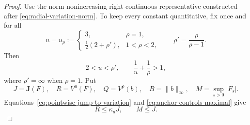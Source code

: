 \documentclass[11pt]{article}
\numberwithin{equation}{section}
\theoremstyle{remark}
\theoremstyle{definition}
\begin{document}
\begin{proof}
Use the norm-nonincreasing right-continuous representative constructed
after \eqref{eq:radial-variation-norm}.  To keep every constant quantitative,
fix once and for all
\[
 u=u_\rho:=
 \begin{cases}
  3,&\rho=1,\\[1mm]
  \frac12(2+\rho'),&1<\rho<2,
 \end{cases}
 \qquad \rho'=\frac{\rho}{\rho-1}.
\]
Then
\begin{equation}\label{eq:young-exponents}
 2<u<\rho',
 \qquad \frac1u+\frac1\rho>1,
\end{equation}
where $\rho'=\infty$ when $\rho=1$.  Put
\[
 J=\mathbf J(F),\quad R=V^u(F),\quad Q=V^\rho(b),
 \quad B=\|b\|_\infty,\quad M=\sup_{s>0}|F_s|.
\]
Equations~\eqref{eq:pointwise-jump-to-variation} and
\eqref{eq:anchor-controls-maximal} give
\begin{equation}\label{eq:young-RM-control}
 R\le\kappa_uJ,\qquad M\le J.
\end{equation}


\end{proof}
\end{document}
